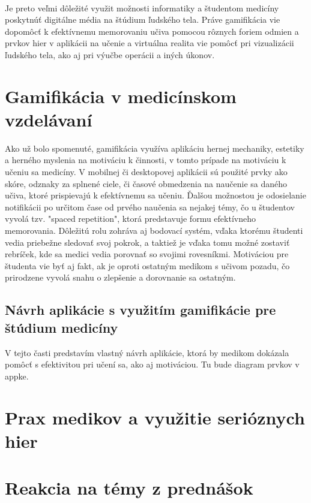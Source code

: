 \documentclass[10pt,twoside,slovak,a4paper]{article}
\begin{document}
\paragraph{}
Je preto veľmi dôležité využit možnosti informatiky a študentom medicíny poskytnúť digitálne média na štúdium ľudského tela. Práve gamifikácia vie dopomôcť k efektívnemu memorovaniu učiva pomocou rôznych foriem odmien a prvkov hier v aplikácii na učenie a virtuálna realita vie pomôcť pri vizualizácii ľudského tela, ako aj pri výučbe operácii a iných úkonov.



\section{Gamifikácia v medicínskom vzdelávaní} \label{druhacast}
Ako už bolo spomenuté, gamifikácia využíva aplikáciu hernej mechaniky, estetiky a herného myslenia na motiváciu k činnosti, v tomto prípade na motiváciu k učeniu sa medicíny. V mobilnej či desktopovej aplikácii sú použité prvky ako skóre, odznaky za splnené ciele, či časové obmedzenia na naučenie sa daného učiva, ktoré prispievajú k efektívnemu sa učeniu. \cite{RojasGamification} Ďalšou možnostou je odosielanie notifikácii po určitom čase od prvého naučenia sa nejakej témy, čo u študentov vyvolá tzv. "spaced repetition", ktorá predstavuje formu efektívneho memorovania. Dôležitú rolu zohráva aj bodovací systém, vďaka ktorému študenti vedia priebežne sledovať svoj pokrok, a taktiež je vďaka tomu možné zostaviť rebríček, kde sa medici vedia porovnať so svojimi rovesníkmi. Motiváciou pre študenta vie byť aj fakt, ak je oproti ostatným medikom s učivom pozadu, čo prirodzene vyvolá snahu o zlepšenie a dorovnanie sa ostatným. \cite{RojasGamification}

\subsection{Návrh aplikácie s využitím gamifikácie pre štúdium medicíny} \label{druhacast:aplikacia} 
V tejto časti predstavím vlastný návrh aplikácie, ktorá by medikom dokázala pomôcť s efektivitou pri učení sa, ako aj motiváciou. Tu bude diagram prvkov v appke.


\section{Prax medikov a využitie serióznych hier} \label{tretiacast}

\section{Reakcia na témy z prednášok} \label{prednasky}
\end{document}
